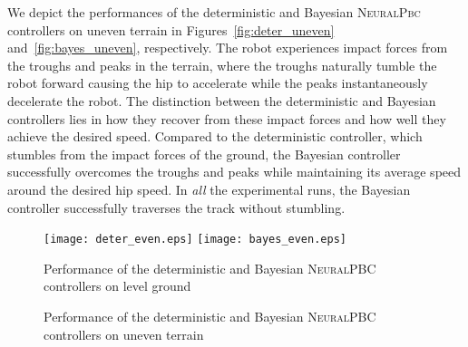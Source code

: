 We depict the performances of the deterministic and Bayesian \textsc{NeuralPbc}
controllers on uneven terrain in Figures~\ref{fig:deter_uneven}
and~\ref{fig:bayes_uneven}, respectively.
%
The robot experiences impact forces from the troughs and peaks in the terrain,
where the troughs naturally tumble the robot forward causing the hip to accelerate
while the peaks instantaneously decelerate the robot.  
%
The distinction between the deterministic and Bayesian controllers lies in how
they recover from these impact forces and how well they achieve the desired
speed.
%
Compared to the deterministic controller, which stumbles from the impact
forces of the ground, the Bayesian controller successfully overcomes the troughs
and peaks while maintaining its average speed around the desired hip speed.
%
In \textit{all} the experimental runs, the Bayesian controller successfully
traverses the track without stumbling. 
%
\begin{figure}[H]
    \centering
    \texttt{[image: deter\_even.eps]}\hfill
    \texttt{[image: bayes\_even.eps]}
    \caption{Performance of the deterministic and Bayesian \textsc{NeuralPBC} controllers on level ground}
    \label{fig:deter_vs_bayes_hardware_even}
\end{figure}
%
\begin{figure}[H]
    \centering
    \begin{minipage}{0.47\linewidth}
    \end{minipage}\hfill
    \begin{minipage}{0.47\linewidth}
    \end{minipage}
    \caption{Performance of the deterministic and Bayesian \textsc{NeuralPBC} controllers on uneven terrain}
    \label{fig:deter_vs_bayes_hardware_UNeven}
\end{figure}

